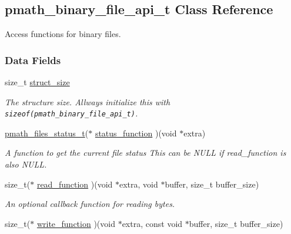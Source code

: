 \hypertarget{structpmath__binary__file__api__t}{
\subsection{pmath\_\-binary\_\-file\_\-api\_\-t Class Reference}
\label{structpmath__binary__file__api__t}
}
Access functions for binary files.  


\subsubsection*{Data Fields}
\begin{CompactItemize}
\item 
\hypertarget{structpmath__binary__file__api__t_f1c8d2a0b5e021ff01f2c1dd132464a8}{
size\_\-t \hyperlink{structpmath__binary__file__api__t_f1c8d2a0b5e021ff01f2c1dd132464a8}{struct\_\-size}}
\label{structpmath__binary__file__api__t_f1c8d2a0b5e021ff01f2c1dd132464a8}

\begin{CompactList}\small\item\em The structure size. Allways initialize this with {\tt sizeof(pmath\_\-binary\_\-file\_\-api\_\-t)}. \item\end{CompactList}\item 
\hypertarget{structpmath__binary__file__api__t_5018fd5d68aaf957e98465105a87b65a}{
\hyperlink{group__file__api_g1fa07caf59a04495b7c74be6aff3a3d9}{pmath\_\-files\_\-status\_\-t}($\ast$ \hyperlink{structpmath__binary__file__api__t_5018fd5d68aaf957e98465105a87b65a}{status\_\-function} )(void $\ast$extra)}
\label{structpmath__binary__file__api__t_5018fd5d68aaf957e98465105a87b65a}

\begin{CompactList}\small\item\em A function to get the current file status This can be NULL if read\_\-function is also NULL. \item\end{CompactList}\item 
\hypertarget{structpmath__binary__file__api__t_eb5ccc97e169734f337d3ea609129c6e}{
size\_\-t($\ast$ \hyperlink{structpmath__binary__file__api__t_eb5ccc97e169734f337d3ea609129c6e}{read\_\-function} )(void $\ast$extra, void $\ast$buffer, size\_\-t buffer\_\-size)}
\label{structpmath__binary__file__api__t_eb5ccc97e169734f337d3ea609129c6e}

\begin{CompactList}\small\item\em An optional callback function for reading bytes. \item\end{CompactList}\item 
\hypertarget{structpmath__binary__file__api__t_7445768eba204b0afbbf6e5002339e63}{
size\_\-t($\ast$ \hyperlink{structpmath__binary__file__api__t_7445768eba204b0afbbf6e5002339e63}{write\_\-function} )(void $\ast$extra, const void $\ast$buffer, size\_\-t buffer\_\-size)}
\label{structpmath__binary__file__api__t_7445768eba204b0afbbf6e5002339e63}


\end{CompactItemize}
